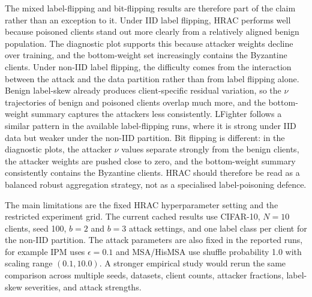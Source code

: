 The mixed label-flipping and bit-flipping results are therefore part of the
claim rather than an exception to it. Under IID label flipping, HRAC performs
well because poisoned clients stand out more clearly from a relatively aligned
benign population. The diagnostic plot supports this because attacker weights
decline over training, and the bottom-weight set increasingly contains the
Byzantine clients. Under non-IID label flipping, the difficulty comes from the
interaction between the attack and the data partition rather than from label
flipping alone. Benign label-skew already produces client-specific residual
variation, so the $\nu$ trajectories of benign and poisoned clients overlap
much more, and the bottom-weight summary captures the attackers less
consistently. LFighter follows a similar pattern in the available
label-flipping runs, where it is strong under IID data but weaker under the
non-IID partition. Bit flipping is different: in the diagnostic plots, the
attacker $\nu$ values separate strongly from the benign clients, the attacker
weights are pushed close to zero, and the bottom-weight summary consistently
contains the Byzantine clients. HRAC should therefore be read as a balanced
robust aggregation strategy, not as a specialised label-poisoning defence.

The main limitations are the fixed HRAC hyperparameter setting and the
restricted experiment grid. The current cached results use CIFAR-10, \(N=10\)
clients, seed 100, \(b=2\) and \(b=3\) attack settings, and one label class per
client for the non-IID partition. The attack parameters are also fixed in the
reported runs, for example IPM uses \(\epsilon=0.1\) and MSA/HisMSA use shuffle
probability 1.0 with scaling range \((0.1,10.0)\). A stronger empirical study
would rerun the same comparison across multiple seeds, datasets, client counts,
attacker fractions, label-skew severities, and attack strengths.
